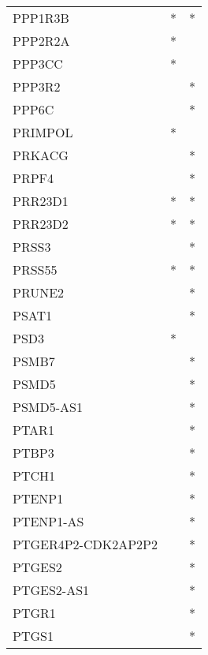 \begin{longtable}{lcc}
PPP1R3B               &              * &          * \\
PPP2R2A               &              * &            \\
PPP3CC                &              * &            \\
PPP3R2                &                &          * \\
PPP6C                 &                &          * \\
PRIMPOL               &              * &            \\
PRKACG                &                &          * \\
PRPF4                 &                &          * \\
PRR23D1               &              * &          * \\
PRR23D2               &              * &          * \\
PRSS3                 &                &          * \\
PRSS55                &              * &          * \\
PRUNE2                &                &          * \\
PSAT1                 &                &          * \\
PSD3                  &              * &            \\
PSMB7                 &                &          * \\
PSMD5                 &                &          * \\
PSMD5-AS1             &                &          * \\
PTAR1                 &                &          * \\
PTBP3                 &                &          * \\
PTCH1                 &                &          * \\
PTENP1                &                &          * \\
PTENP1-AS             &                &          * \\
PTGER4P2-CDK2AP2P2    &                &          * \\
PTGES2                &                &          * \\
PTGES2-AS1            &                &          * \\
PTGR1                 &                &          * \\
PTGS1                 &                &          * \\

\end{longtable}

